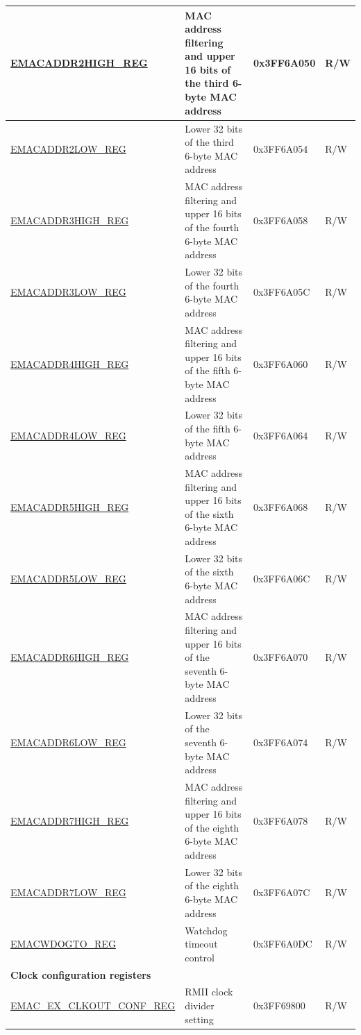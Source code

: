 \begin{longtable}{ |m{5cm} |m{6cm} | m{2cm} |m{2.2cm} | }
\hyperref[regdesc:EMACADDR2HIGHREG]{EMACADDR2HIGH\_REG} & MAC address filtering and upper 16 bits of the third 6-byte MAC address & 0x3FF6A050 & R/W \\ \hline
\hyperref[regdesc:EMACADDR2LOWREG]{EMACADDR2LOW\_REG} & Lower 32 bits of the third 6-byte MAC address & 0x3FF6A054 & R/W \\ \hline
\hyperref[regdesc:EMACADDR3HIGHREG]{EMACADDR3HIGH\_REG} & MAC address filtering and upper 16 bits of the fourth 6-byte MAC address & 0x3FF6A058 & R/W \\ \hline
\hyperref[regdesc:EMACADDR3LOWREG]{EMACADDR3LOW\_REG} & Lower 32 bits of the fourth 6-byte MAC address & 0x3FF6A05C & R/W \\ \hline
\hyperref[regdesc:EMACADDR4HIGHREG]{EMACADDR4HIGH\_REG} & MAC address filtering and upper 16 bits of the fifth 6-byte MAC address & 0x3FF6A060 & R/W \\ \hline
\hyperref[regdesc:EMACADDR4LOWREG]{EMACADDR4LOW\_REG} & Lower 32 bits of the fifth 6-byte MAC address & 0x3FF6A064 & R/W \\ \hline
\hyperref[regdesc:EMACADDR5HIGHREG]{EMACADDR5HIGH\_REG} & MAC address filtering and upper 16 bits of the sixth 6-byte MAC address & 0x3FF6A068 & R/W \\ \hline
\hyperref[regdesc:EMACADDR5LOWREG]{EMACADDR5LOW\_REG} & Lower 32 bits of the sixth 6-byte MAC address & 0x3FF6A06C & R/W \\ \hline
\hyperref[regdesc:EMACADDR6HIGHREG]{EMACADDR6HIGH\_REG} & MAC address filtering and upper 16 bits of the seventh 6-byte MAC address & 0x3FF6A070 & R/W \\ \hline
\hyperref[regdesc:EMACADDR6LOWREG]{EMACADDR6LOW\_REG} & Lower 32 bits of the seventh 6-byte MAC address & 0x3FF6A074 & R/W \\ \hline
\hyperref[regdesc:EMACADDR7HIGHREG]{EMACADDR7HIGH\_REG} & MAC address filtering and upper 16 bits of the eighth 6-byte MAC address & 0x3FF6A078 & R/W \\ \hline
\hyperref[regdesc:EMACADDR7LOWREG]{EMACADDR7LOW\_REG} & Lower 32 bits of the eighth 6-byte MAC address & 0x3FF6A07C & R/W \\ \hline
\hyperref[regdesc:EMACWDOGTOREG]{EMACWDOGTO\_REG} & Watchdog timeout control & 0x3FF6A0DC & R/W \\ \hline
\multicolumn{4}{|l|}{\textbf{Clock configuration registers}} \\ \hline
\hyperref[regdesc:EMACEXCLKOUTCONFREG]{EMAC\_EX\_CLKOUT\_CONF\_REG} & RMII clock divider setting & 0x3FF69800 & R/W \\ \hline

\end{longtable}
